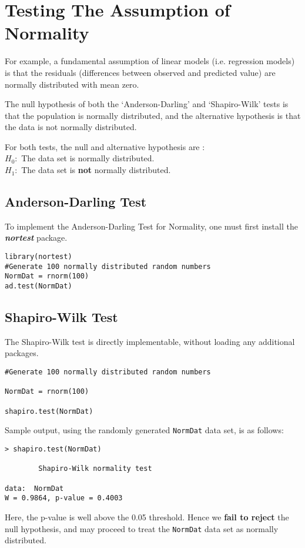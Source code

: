 ﻿\section{Testing The Assumption of Normality}
For example, a fundamental assumption of linear models (i.e. regression models) is that the residuals (differences between observed and predicted value) are normally distributed with mean zero.


The null hypothesis of both the `Anderson-Darling' and `Shapiro-Wilk' tests is that the population is normally distributed, and the alternative hypothesis is that the data is not normally distributed.

For both tests, the null and alternative hypothesis are :\\
\qquad $H_0 : $ The data set is normally distributed.\\
\qquad $H_1 : $ The data set is \textbf{not} normally distributed.\\

\subsection{Anderson-Darling Test}
To implement the Anderson-Darling Test for Normality, one must first install the \textbf{\emph{nortest}} package.

\begin{framed}
\begin{verbatim}
library(nortest)
#Generate 100 normally distributed random numbers
NormDat = rnorm(100)
ad.test(NormDat)
\end{verbatim}
\end{framed}
\subsection{Shapiro-Wilk Test}
The Shapiro-Wilk test is directly implementable, without loading any additional packages.

\begin{framed}
\begin{verbatim}
#Generate 100 normally distributed random numbers

NormDat = rnorm(100)

shapiro.test(NormDat)
\end{verbatim}
\end{framed}
Sample output, using the randomly generated \texttt{NormDat} data set, is as follows:
\begin{verbatim}
> shapiro.test(NormDat)

        Shapiro-Wilk normality test

data:  NormDat
W = 0.9864, p-value = 0.4003
\end{verbatim}
Here, the p-value is well above the 0.05 threshold. Hence we \textbf{fail to reject} the null hypothesis, and may proceed to treat the \texttt{NormDat} data set as normally distributed.
